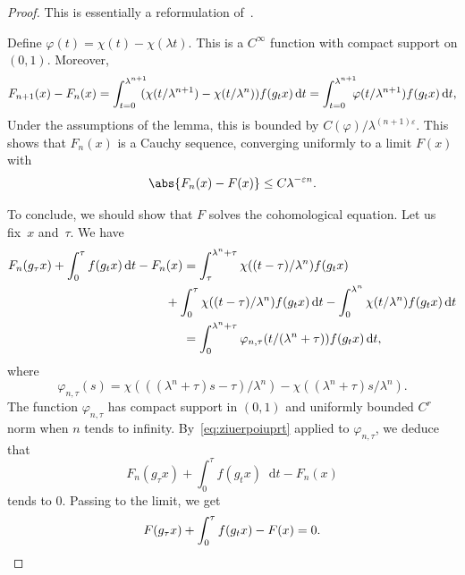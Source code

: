 \documentclass[10pt]{amsart}
\newcommand{\dd}{\mathop{}\!\mathrm{d}}
\let\epsilon\varepsilon
\let\phi\varphi
\theoremstyle{definition}
\numberwithin{equation}{section}
\begin{document}
\begin{proof}
This is essentially a reformulation of~\cite[Lem.\,1.4\,\&\,Lem.\,3.1]{giulietti_liverani}.

Define $\phi(t) = \chi(t)-\chi(\lambda t)$. This is a $C^\infty$ function
with compact support on $(0,1)$. Moreover,
\begin{equation*}
F_{n+1}(x) - F_n(x) = \int_{t=0}^{\lambda^{n+1}}\hspace*{-2mm} (\chi(t/\lambda^{n+1}) - \chi(t/\lambda^n)) f(g_t x) \dd t
= \int_{t=0}^{\lambda^{n+1}}\hspace*{-2mm} \phi(t/\lambda^{n+1}) f(g_t x) \dd t,
\end{equation*}
Under the assumptions of the lemma, this is bounded by
$C(\phi)/\lambda^{(n+1)\epsilon}$. This shows that $F_n(x)$ is a Cauchy
sequence, converging uniformly to a limit $F(x)$ with
\[
\abs{F_n(x)-F(x)} \leq
C \lambda^{-\epsilon n}.
\]

To conclude, we should show that $F$ solves the cohomological equation. Let
us fix~$x$ and~$\tau$. We have
\begin{align*}
F_n(g_\tau x) + \int_{0}^\tau f(g_t x) \dd t - F_n(x)&= \int_{\tau}^{\lambda^n + \tau} \chi((t-\tau)/\lambda^n) f(g_t x)\\
&\hspace*{-5mm}+ \int_{0}^\tau \chi((t-\tau)/\lambda^n) f(g_t x) \dd t
- \int_0^{\lambda^n} \chi(t/\lambda^n) f(g_t x) \dd t
\\
& = \int_0^{\lambda^n + \tau} \phi_{n,\tau}(t/(\lambda^n + \tau)) f(g_t x) \dd t,
\end{align*}
where
\begin{equation*}
\phi_{n,\tau}(s) = \chi( ((\lambda^n+\tau) s - \tau)/\lambda^n) - \chi( (\lambda^n+\tau)s/\lambda^n).
\end{equation*}
The function $\phi_{n,\tau}$ has compact support in $(0,1)$ and uniformly
bounded $C^r$ norm when $n$ tends to infinity. By~\eqref{eq:ziuerpoiuprt}
applied to $\phi_{n,\tau}$, we deduce that
\[
F_n(g_\tau x) + \int_{0}^\tau
f(g_t x) \dd t - F_n(x)
\]
tends to $0$. Passing to the limit, we get
\[
F(g_\tau
x) + \int_0^\tau f(g_t x) - F(x) = 0.\qedhere
\]
\end{proof}
\end{document}
